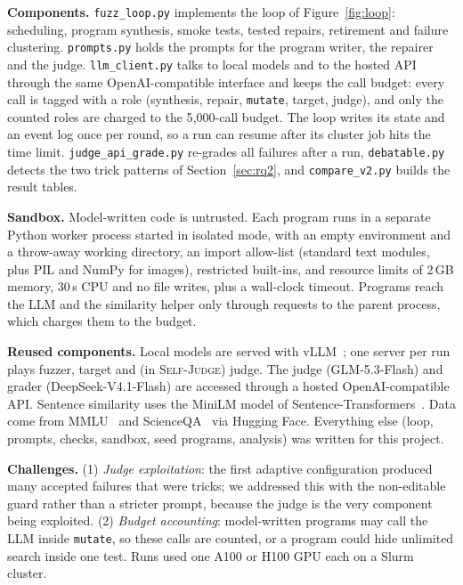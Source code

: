 \documentclass[sigconf]{acmart}
\newcommand{\SJ}{\textsc{Self-Judge}}
\begin{document}
\textbf{Components.} \texttt{fuzz\_loop.py} implements the loop of Figure~\ref{fig:loop}: scheduling, program
synthesis, smoke tests, tested repairs, retirement and failure clustering. \texttt{prompts.py} holds the prompts for the
program writer, the repairer and the judge. \texttt{llm\_client.py} talks to local models and to the hosted API through
the same OpenAI-compatible interface and keeps the call budget: every call is tagged with a role (synthesis, repair,
\texttt{mutate}, target, judge), and only the counted roles are charged to the 5{,}000-call budget. The loop writes its
state and an event log once per round, so a run can resume after its cluster job hits the time limit.
\texttt{judge\_api\_grade.py} re-grades all failures after a run, \texttt{debatable.py} detects the two trick patterns
of Section~\ref{sec:rq2}, and \texttt{compare\_v2.py} builds the result tables.

\textbf{Sandbox.} Model-written code is untrusted. Each program runs in a separate Python worker process started in
isolated mode, with an empty environment and a throw-away working directory, an import allow-list (standard text
modules, plus PIL and NumPy for images), restricted built-ins, and resource limits of 2\,GB memory, 30\,s CPU and no
file writes, plus a wall-clock timeout. Programs reach the LLM and the similarity helper only through requests to the
parent process, which charges them to the budget.

\textbf{Reused components.} Local models are served with vLLM~\cite{kwon2023vllm}; one server per run plays fuzzer,
target and (in \SJ{}) judge. The judge (GLM-5.3-Flash) and grader (DeepSeek-V4.1-Flash) are accessed through a
hosted OpenAI-compatible API. Sentence similarity uses the MiniLM model of Sentence-Transformers~\cite{reimers2019sbert}.
Data come from MMLU~\cite{hendrycks2021mmlu} and ScienceQA~\cite{lu2022scienceqa} via Hugging Face. Everything else
(loop, prompts, checks, sandbox, seed programs, analysis) was written for this project.

\textbf{Challenges.} (1) \emph{Judge exploitation}: the first adaptive configuration produced many accepted failures that
were tricks; we addressed this with the non-editable guard rather than a stricter prompt, because the judge is the very
component being exploited. (2) \emph{Budget accounting}: model-written programs may call the LLM inside
\texttt{mutate}, so these calls are counted, or a program could hide unlimited search inside one test. Runs used one A100 or H100 GPU each on a Slurm cluster.
\end{document}
